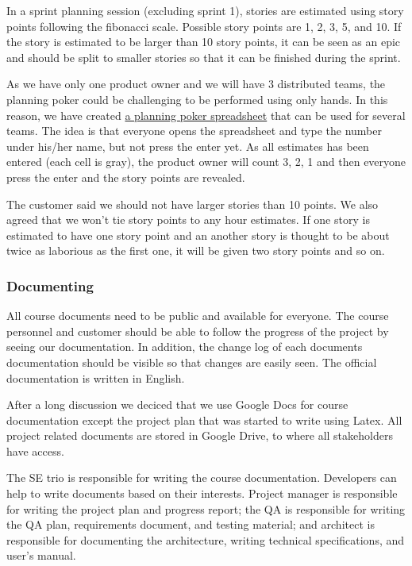 In a sprint planning session (excluding sprint 1), stories are estimated using
story points following the fibonacci scale. Possible story points
are 1, 2, 3, 5, and 10. If the story is estimated to be larger than 10 story
points, it can be seen as an epic and should be split to smaller stories so that
it can be finished during the sprint.

As we have only one product owner and we will have 3 distributed teams, the
planning poker could be challenging to be performed using only hands. In this
reason, we have created
\href{https://docs.google.com/spreadsheet/ccc?key=0Ahu59q_GwtcedFp4dXQzVmFoQWlxandqMkxtdEFiaVE&usp=sharing}{a
planning poker spreadsheet} that can be used for several teams. The idea is that
everyone opens the spreadsheet and type the number under his/her name, but not
press the enter yet. As all estimates has been entered (each cell is gray), the
product owner will count 3, 2, 1 and then everyone press the enter and the story
points are revealed.

The customer said we should not have larger stories than 10 points. We also
agreed that we won't tie story points to any hour estimates. If one story is
estimated to have one story point and an another story is thought to be about
twice as laborious as the first one, it will be given two story points and so
on.

\subsubsection{Documenting}

All course documents need to be public and available for everyone. The course 
personnel and customer should be able to follow the progress of the project by 
seeing our documentation. In addition, the change log of each documents 
documentation should be visible so that changes are easily seen. The official
documentation is written in English.

After a long discussion we deciced that we use Google Docs for course
documentation except the project plan that was started to write using Latex. All
project related documents are stored in Google Drive, to where all stakeholders
have access.

The SE trio is responsible for writing the course documentation. 
Developers can help to write documents based on their interests. Project manager
is responsible for writing the project plan and progress report; the QA is
responsible for writing the QA plan, requirements document, and testing
material; and architect is responsible for documenting the architecture, writing
technical specifications, and user's manual.

